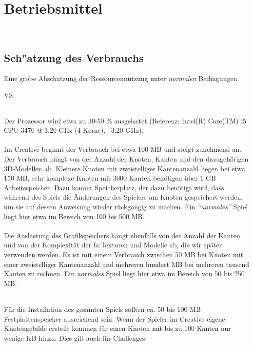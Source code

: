 %
%


\chapter{Betriebsmittel}
\label{BM}~\\

\section{Sch{"a}tzung des Verbrauchs}
\label{BM:Verbrauch}

Eine grobe Abschätzung der Ressourcennutzung unter \textit{normalen} Bedingungen.\\

\begin{ids}{\gls{VS}}

	 \hfill\\

	Der Prozessor wird etwa zu 30-50 \% ausgelastet (Referenz: Intel(R) Core(TM) i5 CPU 3470 @ 3.20 GHz (4 Kerne), ~3.20 GHz).\\
	
	 \hfill\\
	
	Im Creative beginnt der Verbrauch bei etwa 100 MB und steigt zunehmend an. Der Verbrauch hängt von der Anzahl der Knoten, Kanten und den dazugehörigen 3D-Modellen ab. Kleinere Knoten mit zweistelliger Kantenanzahl	liegen bei etwa 150 MB, sehr komplexe Knoten mit 3000 Kanten benötigen über 1 GB Arbeitsspeicher. Dazu kommt Speicherplatz, der dazu benötigt wird, dass während des Spiels die Änderungen des Spielers am Knoten gespeichert werden, um sie auf dessen Anweisung wieder rückgängig zu machen. Ein \textit{\textquotedblleft{}normales\textquotedblright} Spiel liegt hier etwa im Bereich von 100 bis 500 MB.\\

	 \hfill\\
	
	Die Auslastung des Grafikspeichers hängt ebenfalls von der Anzahl der Kanten und von der Komplexität der \gls{fa:Textur}en und Modelle ab, die wir später verwenden werden. Es ist mit einem Verbrauch zwischen 50 MB bei Knoten mit einer zweistelliger Kantenanzahl und mehreren hundert MB bei mehreren tausend Kanten zu rechnen.
	Ein \textit{\glqq normales\grqq} Spiel liegt hier etwa im Bereich von 50 bis 250 MB.


\clearpage


	 \hfill\\
		
	Für die Installation des gesamten Spiels sollten ca. 50 bis 100 MB Festplattenspeicher ausreichend sein. Wenn der Spieler im Creative eigene Knotengebilde erstellt kommen für einen Knoten mit bis zu 100 Kanten nur wenige KB hinzu. Dies gilt auch für Challenges.\\

\end{ids}


